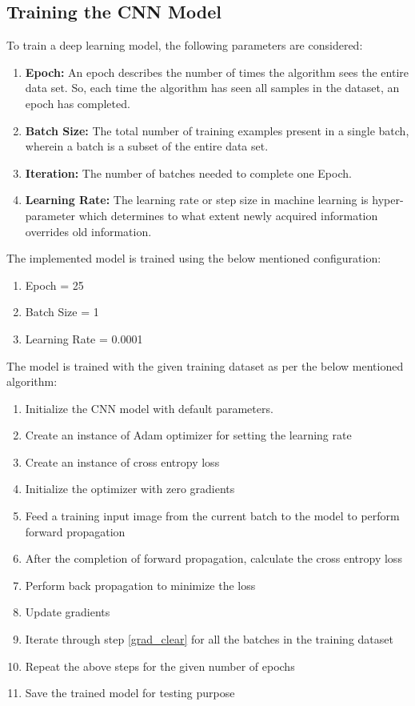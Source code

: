 \documentclass[12pt]{article}
\begin{document}
\subsection{Training the CNN Model}
\label{model_train}
To train a deep learning model, the following parameters are considered:
\begin{enumerate}
	\item \textbf{Epoch:} An epoch describes the number of times the algorithm sees the entire data set. So, each time the algorithm has seen all samples in the dataset, an epoch has completed.
	\item \textbf{Batch Size:} The total number of training examples present in a single batch, wherein a batch is a subset of the entire data set. 
	\item \textbf{Iteration:} The number of batches needed to complete one Epoch.
	\item \textbf{Learning Rate:} The learning rate or step size in machine learning is hyper-parameter which determines to what extent newly acquired information overrides old information.	
\end{enumerate}

The implemented model is trained using the below mentioned configuration:
\begin{enumerate}
	\item Epoch = 25	
	\item Batch Size = 1
	\item Learning Rate = 0.0001
\end{enumerate}

The model is trained with the given training dataset as per the below mentioned algorithm:
\begin{enumerate}
	\item Initialize the CNN model with default parameters. 
	\item Create an instance of Adam optimizer for setting the learning rate
	\item Create an instance of cross entropy loss
	\item Initialize the optimizer with zero gradients \label{grad_clear}
	\item Feed a training input image from the current batch to the model to perform forward propagation
	\item After the completion of forward propagation, calculate the cross entropy loss
	\item Perform back propagation to minimize the loss
	\item Update gradients
	\item Iterate through step \ref{grad_clear} for all the batches in the training dataset
	\item Repeat the above steps for the given number of epochs
	\item Save the trained model for testing purpose
	
\end{enumerate}
\end{document}
